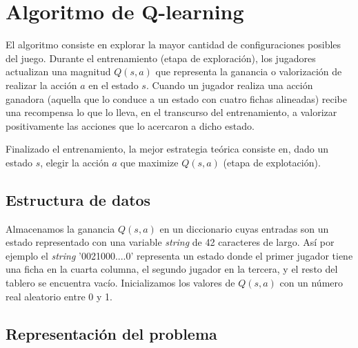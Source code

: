 \documentclass[11pt, spanish]{article}
\begin{document}
\section{Algoritmo de Q-learning}

\par El algoritmo consiste en explorar la mayor cantidad de configuraciones 
posibles del juego. Durante el entrenamiento (etapa de exploración), los 
jugadores actualizan una magnitud $Q(s,a)$ que representa la ganancia o 
valorización de realizar la acción $a$ en el estado $s$. Cuando un jugador 
realiza una acción ganadora (aquella que lo conduce a un estado con cuatro 
fichas alineadas) recibe una recompensa lo que lo lleva, en el 
transcurso del entrenamiento, a valorizar positivamente las 
acciones que lo acercaron a dicho estado. 
\par Finalizado el entrenamiento, la mejor estrategia teórica consiste en, dado 
un estado $s$, elegir la acción $a$ que maximize $Q(s,a)$ (etapa de 
explotación).

\subsection{Estructura de datos}

\par Almacenamos la ganancia $Q(s,a)$ en un diccionario cuyas entradas son un 
estado representado con una variable \emph{string} de 42 caracteres de largo. 
Así por ejemplo el \emph{string} '0021000....0' representa un estado donde 
el primer jugador tiene una ficha en la cuarta columna, el segundo jugador en 
la tercera, y el resto del tablero se encuentra vacío. Inicializamos los valores de $Q(s,a)$ con un número real aleatorio entre 0 y 1.

\subsection{Representación del problema}
\end{document}
